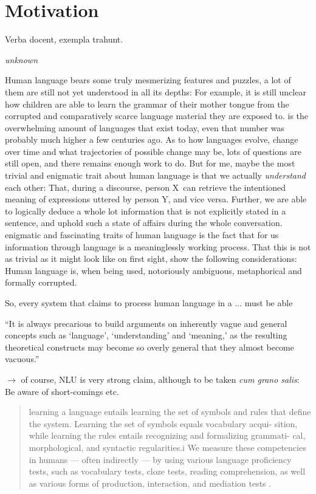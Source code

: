 \label{chap:1_intro}


\section{Motivation}

\epigraph{Verba docent, exempla trahunt.}{\textit{unknown}}

Human language bears some truly mesmerizing features and puzzles, a lot of them are still not
yet understood in all its depths: For example, it is still unclear how children are able to
learn the grammar of their mother tongue from the corrupted and comparatively scarce language
material they are exposed to. %
is the overwhelming amount of languages that exist today, even that number was probably much
higher a few centuries ago.  As to how languages evolve, change over time and what trajectories
of possible change may be, lots of questions are still open, and there remains enough work
to do.  But for me, maybe the most trivial and enigmatic trait about human language is that
we actually \emph{understand} each other: That, during a discourse, person X can retrieve
the intentioned meaning of expressions uttered by person Y, and vice versa.  Further, we are
able to logically deduce a whole lot information that is not explicitly stated in a sentence,
and uphold such a state of affairs during the whole conversation.  %
enigmatic and fascinating traits of human language is the fact that for us %
information through language is a meaninglessly working process.  That this is not as trivial
as it might look like on first sight, show the following considerations: Human language is,
when being used, notoriously ambiguous, metaphorical and formally corrupted.

So, every system that claims to process human language in a ... must be able

``It is always precarious to build arguments on inherently vague and general
concepts such as `language', `understanding' and `meaning,' as the resulting
theoretical constructs may become so overly general that they almost become
vacuous.'' \cite{sahlgren2021singleton}

{\color{red} $\rightarrow$ of course, NLU is very strong claim, although to be taken \emph{cum grano salis}:
Be aware of short-comings etc.}

\begin{quote}
  learning a language entails learning the set of symbols and rules that define the
  system. Learning the set of symbols equals vocabulary acqui- sition, while learning
  the rules entails recognizing and formalizing grammati- cal, morphological, and
  syntactic regularities.i We measure these competencies in humans — often indirectly
  — by using various language proficiency tests, such as vocabulary tests, cloze
  tests, reading comprehension, as well as various forms of production, interaction,
  and mediation tests \textelp{}. \cite{sahlgren2021singleton}
\end{quote}

